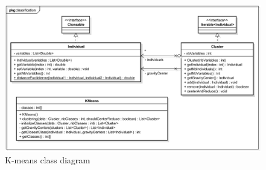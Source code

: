 \begin{figure}[H]
	\centering 
	\includegraphics[width=1\textwidth]{images/diagrams/class_diagram_kmeans}
	\caption{K-means class diagram}
	\label{fig:diagram:class:kmeans}
\end{figure}



